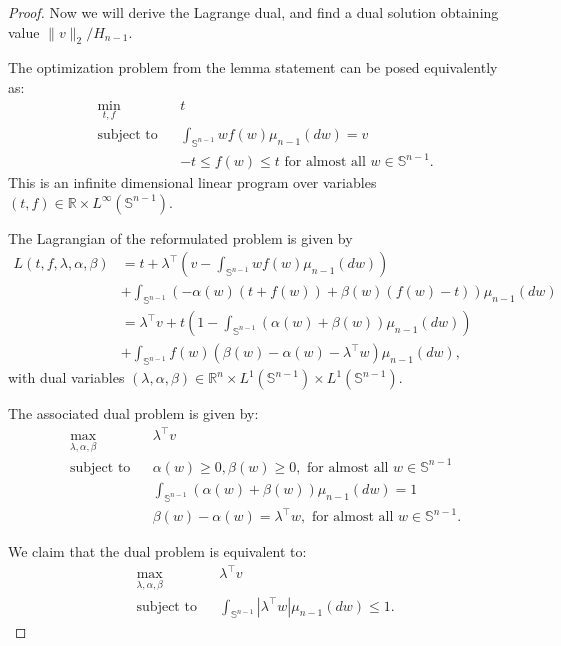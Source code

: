 \documentclass[10pt,a4paper]{amsart}
\newcommand{\R}{\mathbb{R}}
\renewcommand{\S}{\mathbb{S}}
\begin{document}
\begin{proof}
Now we will derive the Lagrange dual, and find a dual solution obtaining value $\|v\|_2/H_{n-1}$.

The optimization problem from the lemma statement can be posed equivalently as:
\begin{align*}
&\min_{t,f} && t\\
&\textrm{subject to} && \int_{\S^{n-1}}w f(w)\mu_{n-1}(dw)=v \\
&&& -t\le f(w)\le t \textrm{ for almost all } w\in\S^{n-1}.
\end{align*}
This is an infinite dimensional linear program over variables $(t,f)\in \R\times L^{\infty}(\S^{n-1})$.

The Lagrangian of the reformulated problem is given by
\begin{align*}
L(t,f,\lambda,\alpha,\beta)%
&=t+\lambda^\top \left(v- \int_{\S^{n-1}}w f(w)\mu_{n-1}(dw)\right)
\\ &+\int_{\S^{n-1}}\left(-\alpha(w)(t+f(w))+\beta(w)(f(w)-t) \right)\mu_{n-1}(dw) \\
&=\lambda^\top v+
t\left(1-\int_{\S^{n-1}}(\alpha(w)+\beta(w))\mu_{n-1}(dw) \right)\\
&+\int_{\S^{n-1}}f(w)\left(\beta(w)-\alpha(w)-\lambda^\top w \right)\mu_{n-1}(dw),
\end{align*}
with dual variables $(\lambda,\alpha,\beta)\in \R^n\times L^1(\S^{n-1})\times L^1(\S^{n-1}).$

The associated dual problem is given by:
\begin{align*}
&\max_{\lambda,\alpha,\beta} && \lambda^\top v \\
&\textrm{subject to} && \alpha(w)\ge 0, \beta(w)\ge 0, \textrm{ for almost all } w\in \S^{n-1} \\
&&& \int_{\S^{n-1}}(\alpha(w)+\beta(w))\mu_{n-1}(dw)=1\\
&&& \beta(w)-\alpha(w)=\lambda^\top w, \textrm{ for almost all } w\in \S^{n-1}.
\end{align*}

We claim that the dual problem is equivalent to:
\begin{subequations}
\label{eq:vDual}
\begin{align}
&\max_{\lambda,\alpha,\beta} && \lambda^\top v \\
&\textrm{subject to} && \int_{\S^{n-1}}|\lambda^\top w|\mu_{n-1}(dw)\le 1.
\end{align}
\end{subequations}


\end{proof}
\end{document}
